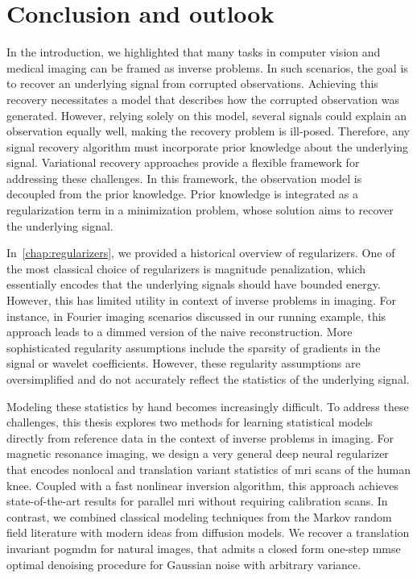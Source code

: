 \chapter{Conclusion and outlook}%
\label{chap:conclusion}%
\graphicspath{{chapters/conclusion/figures}}%
In the introduction, we highlighted that many tasks in computer vision and medical imaging can be framed as inverse problems.
In such scenarios, the goal is to recover an underlying signal from corrupted observations.
Achieving this recovery necessitates a model that describes how the corrupted observation was generated.
However, relying solely on this model, several signals could explain an observation equally well, making the recovery problem is ill-posed.
Therefore, any signal recovery algorithm must incorporate prior knowledge about the underlying signal.
Variational recovery approaches provide a flexible framework for addressing these challenges.
In this framework, the observation model is decoupled from the prior knowledge.
Prior knowledge is integrated as a regularization term in a minimization problem, whose solution aims to recover the underlying signal.

In~\cref{chap:regularizers}, we provided a historical overview of regularizers.
One of the most classical choice of regularizers is magnitude penalization, which essentially encodes that the underlying signals should have bounded energy.
However, this has limited utility in context of inverse problems in imaging.
For instance, in Fourier imaging scenarios discussed in our running example, this approach leads to a dimmed version of the naive reconstruction.
More sophisticated regularity assumptions include the sparsity of gradients in the signal or wavelet coefficients.
However, these regularity assumptions are oversimplified and do not accurately reflect the statistics of the underlying signal.

Modeling these statistics by hand becomes increasingly difficult.
To address these challenges, this thesis explores two methods for learning statistical models directly from reference data in the context of inverse problems in imaging.
For magnetic resonance imaging, we design a very general deep neural regularizer that encodes nonlocal and translation variant statistics of \gls{mri} scans of the human knee.
Coupled with a fast nonlinear inversion algorithm, this approach achieves state-of-the-art results for parallel \gls{mri} without requiring calibration scans.
In contrast, we combined classical modeling techniques from the Markov random field literature with modern ideas from diffusion models.
We recover a translation invariant \gls{pogmdm} for natural images, that admits a closed form one-step \gls{mmse} optimal denoising procedure for Gaussian noise with arbitrary variance.


